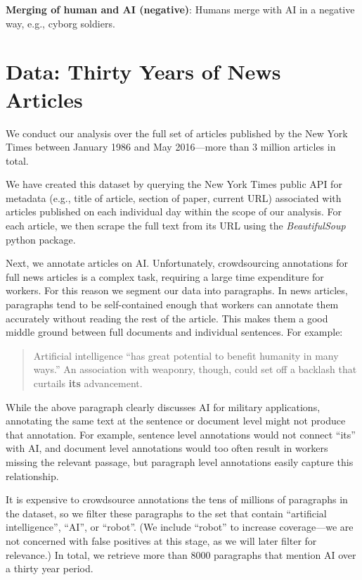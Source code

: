 \documentclass[letterpaper]{article}
\begin{document}
\textbf{Merging of human and AI (negative)}: Humans merge with AI in a negative way, e.g., cyborg soldiers.

\section{Data: Thirty Years of News Articles}

We conduct our analysis over the full set of articles published by the New York Times between January 1986 and May 2016---more than 3 million articles in total. 

We have created this dataset by querying the New York Times public API for metadata (e.g., title of article, section of paper, current URL) associated with articles published on each individual day within the scope of our analysis. For each article, we then scrape the full text from its URL using the \textit{BeautifulSoup} python package.

Next, we annotate articles on AI. Unfortunately, crowdsourcing annotations for full news articles is a complex task, requiring a large time expenditure for workers. For this reason we segment our data into paragraphs. In news articles, paragraphs tend to be self-contained enough that workers can annotate them accurately without reading the rest of the article. %
This makes them a good middle ground between full documents and individual sentences. For example:

\begin{quote}
\small
Artificial intelligence ``has great potential to benefit humanity in many ways.'' An association with weaponry, though, could set off a backlash that curtails \textbf{its} advancement.
\normalsize
\end{quote}

While the above paragraph clearly discusses AI for military applications, annotating the same text at the sentence or document level might not produce that annotation. For example, sentence level annotations would not connect ``its'' with AI, and document level annotations would too often result in workers missing the relevant passage, but paragraph level annotations easily capture this relationship.

It is expensive to crowdsource annotations the tens of millions of paragraphs in the dataset, so we filter these paragraphs to the set that contain ``artificial intelligence'', ``AI'', or ``robot''. (We include ``robot'' to increase coverage---we are not concerned with false positives at this stage, as we will later filter for relevance.) In total, we retrieve more than 8000 paragraphs that mention AI over a thirty year period.
\end{document}
